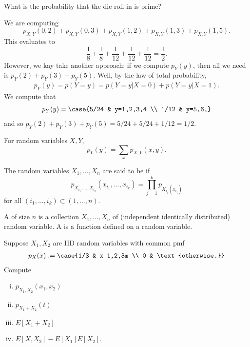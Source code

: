 \documentclass[11pt]{article}
\begin{document}
\begin{que}
What is the probability that the die roll in  is prime?
\end{que}

\begin{solution}
We are computing
\[
p_{X,Y}(0,2)+p_{X,Y}(0,3) + p_{X,Y}(1,2) + p_{X,Y}(1,3) + p_{X,Y}(1,5).
\]
This evaluates to
\[
\frac{1}{8} + \frac{1}{8} + \frac{1}{12} + \frac{1}{12}+\frac{1}{12}= \frac 12.
\]
However, we kay take another approach: if we compute $p_Y(y)$, then all we need is $p_Y(2)+p_Y(3)+p_Y(5)$. Well, by the law of total probability,
\begin{align*}
    p_Y(y)=p(Y=y)=p(Y=y|X=0)+p(Y=y|X=1).
\end{align*}
We compute that
\[
p_Y(y) = \case{5/24 & y=1,2,3,4 \\ 1/12 & y=5,6,}
\]
and so $p_Y(2)+p_Y(3)+p_Y(5)=5/24+5/24+1/12=1/2$.
\end{solution}

\begin{prop}
For random variables $X,Y$,
\[
p_Y(y)=\sum_{x}p_{X,Y}(x,y).
\]
\end{prop}

\begin{defn}
The random variables $X_1,\dots,X_n$ are said to be  if \[
p_{X_{i_1},\dots,X_{i_k}}(x_{i_1},\dots,x_{i_k}) = \prod_{j=1}^k p_{X_{i_j}(x_{i_j})}
\]
for all $(i_1,\dots,i_k)\subset (1,\dots,n).$
\end{defn}

\begin{defn}
A  of size $n$ is a collection $X_1,\dots,X_n$ of  (independent identically distributed) random variable. A  is a function defined on a random variable.
\end{defn}

\begin{ex}
Suppose $X_1,X_2$ are IID random variables with common pmf
\begin{align*}
p_X(x) := \case{1/3 & x=1,2,3m \\ 0 & \text{otherwise.}}
\end{align*}
Compute
\begin{enumerate}[(i)]
    \item $p_{X_1,X_2}(x_1,x_2)$
    \item $p_{X_1+X_2}(t)$
    \item $E[X_1+X_2]$
    \item $E[X_1X_2]-E[X_1]E[X_2]$.
\end{enumerate}
\end{ex}
\end{document}
